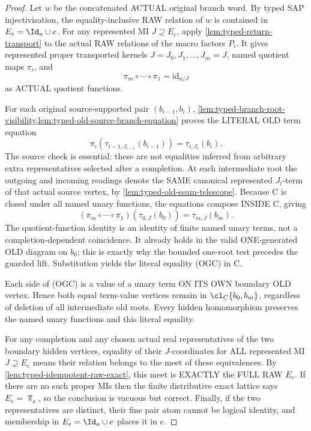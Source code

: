 \begin{proof}
Let \(w\) be the
concatenated ACTUAL
original branch word.
By typed SAP
injectivisation,
the equality-inclusive
RAW relation of \(w\)
is contained in
\(E_e=\Id_a\cup e\).
For any represented
MI \(J\supseteq E_e\),
apply
\cref{lem:typed-return-transport}
to the actual RAW
relations of the macro
factors \(P_i\).
It gives represented
proper transported
kernels
\(J=J_0,J_1,\ldots,
J_m=J\), named quotient
maps \(\pi_i\), and
\[
              \pi_m\circ
                 \cdots\circ\pi_1
                                      =\mathrm{id}_{a/J}
\]
as ACTUAL quotient
functions.

For each original
source-supported pair
\((b_{i-1},b_i)\),
\cref{lem:typed-branch-root-visibility,lem:typed-old-source-branch-equation}
proves the LITERAL OLD
term equation
\[
 \pi_i(\tau_{i-1,J_{i-1}}(b_{i-1}))
       =\tau_{i,J_i}(b_i).
\]
The source check is
essential: these are
not equalities inferred
from arbitrary extra
representatives selected
after a completion.
At each intermediate
root the outgoing and
incoming readings denote
the SAME canonical
represented \(J_i\)-term
of that actual source
vertex, by
\cref{lem:typed-old-seam-telescope}.
Because C is closed under
all named unary functions,
the equations compose
INSIDE C, giving
\[
 (\pi_m\circ\cdots\circ\pi_1)
       (\tau_{0,J}(b_0))
                         =\tau_{m,J}(b_m).
\]
The quotient-function
identity is an identity
of finite named unary
terms, not a
completion-dependent
coincidence. It already
holds in the valid
ONE-generated OLD
diagram on \(b_0\);
this is exactly why the
bounded one-root test
precedes the guarded lift.
Substitution yields
the literal equality
(OGC) in C.

Each side of (OGC) is
a value of a unary term
ON ITS OWN boundary OLD
vertex. Hence both
equal term-value vertices
remain in
\(\cl_C\{b_0,b_m\}\),
regardless of deletion
of all intermediate old
roots. Every hidden
homomorphism preserves
the named unary functions
and this literal
equality.

For any completion and
any chosen actual real
representatives of the
two boundary hidden
vertices, equality of
their \(J\)-coordinates
for ALL represented
MI \(J\supseteq E_e\)
means their relation
belongs to the meet
of these equivalences.
By
\cref{lem:typed-idempotent-raw-exact},
this meet is EXACTLY
the FULL RAW \(E_e\).
If there are no such
proper MIs then the
finite distributive
exact lattice says
\(E_e=\Top_a\), so
the conclusion is
vacuous but correct.
Finally, if the two
representatives are
distinct, their fine
pair atom cannot be
logical identity, and
membership in
\(E_e=\Id_a\cup e\)
places it in \(e\).
\end{proof}

